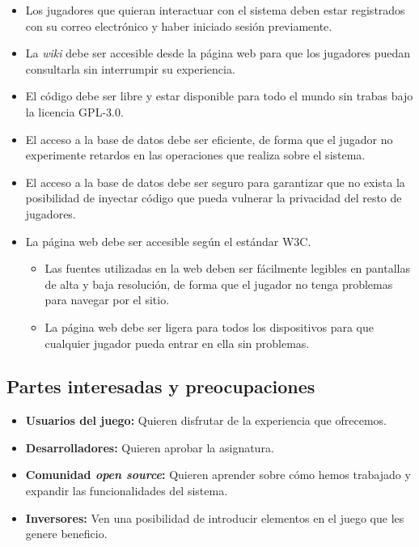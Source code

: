 \begin{itemize}
	\item
		Los jugadores que quieran interactuar con el sistema deben estar registrados con su correo electrónico y haber iniciado sesión previamente.
	\item
		La \textit{wiki} debe ser accesible desde la página web para que los jugadores puedan consultarla sin interrumpir su experiencia.
	\item
		El código debe ser libre y estar disponible para todo el mundo sin trabas bajo la licencia GPL-3.0.
	\item
		El acceso a la base de datos debe ser eficiente, de forma que el jugador no experimente retardos en las operaciones que realiza sobre el sistema.
	\item
		El acceso a la base de datos debe ser seguro para garantizar que no exista la posibilidad de inyectar código que pueda vulnerar la privacidad del resto de jugadores.
	\item
		La página web debe ser accesible según el estándar W3C\@.
		\begin{itemize}
			\item
				Las fuentes utilizadas en la web deben ser fácilmente legibles en pantallas de alta y baja resolución, de forma que el jugador no tenga problemas para navegar por el sitio.
			\item
				La página web debe ser ligera para todos los dispositivos para que cualquier jugador pueda entrar en ella sin problemas.
		\end{itemize}
\end{itemize}

\subsection{Partes interesadas y preocupaciones}

\begin{itemize}
	\item
		\textbf{Usuarios del juego:}
		Quieren disfrutar de la experiencia que ofrecemos.
	\item
		\textbf{Desarrolladores:}
		Quieren aprobar la asignatura.
	\item
		\textbf{Comunidad \textit{open source}:}
		Quieren aprender sobre cómo hemos trabajado y expandir las funcionalidades del sistema.
	\item
		\textbf{Inversores:}
		Ven una posibilidad de introducir elementos en el juego que les genere beneficio.
\end{itemize}

